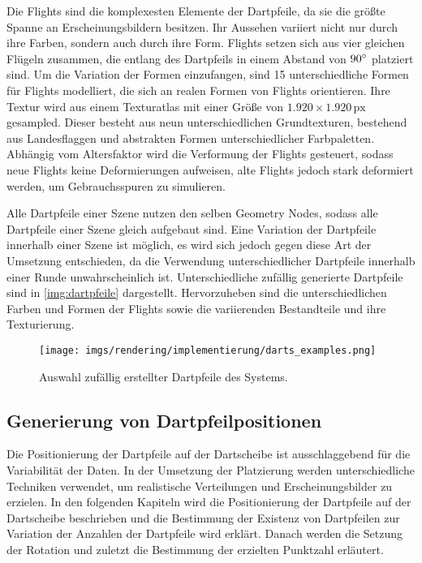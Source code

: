 Die Flights sind die komplexesten Elemente der Dartpfeile, da sie die größte Spanne an Erscheinungsbildern besitzen. Ihr Aussehen variiert nicht nur durch ihre Farben, sondern auch durch ihre Form. Flights setzen sich aus vier gleichen Flügeln zusammen, die entlang des Dartpfeils in einem Abstand von $90^{\circ}$ platziert sind. Um die Variation der Formen einzufangen, sind 15 unterschiedliche Formen für Flights modelliert, die sich an realen Formen von Flights orientieren. Ihre Textur wird aus einem Texturatlas mit einer Größe von $1.920 \times 1.920\,\text{px}$ gesampled. Dieser besteht aus neun unterschiedlichen Grundtexturen, bestehend aus Landesflaggen und abstrakten Formen unterschiedlicher Farbpaletten. Abhängig vom Altersfaktor wird die Verformung der Flights gesteuert, sodass neue Flights keine Deformierungen aufweisen, alte Flights jedoch stark deformiert werden, um Gebrauchsspuren zu simulieren.

\vspace{\baselineskip}

\noindent Alle Dartpfeile einer Szene nutzen den selben Geometry Nodes, sodass alle Dartpfeile einer Szene gleich aufgebaut sind. Eine Variation der Dartpfeile innerhalb einer Szene ist möglich, es wird sich jedoch gegen diese Art der Umsetzung entschieden, da die Verwendung unterschiedlicher Dartpfeile innerhalb einer Runde unwahrscheinlich ist. Unterschiedliche zufällig generierte Dartpfeile sind in \autoref{img:dartpfeile} dargestellt. Hervorzuheben sind die unterschiedlichen Farben und Formen der Flights sowie die variierenden Bestandteile und ihre Texturierung.

\begin{figure}
    \centering
    \texttt{[image: imgs/rendering/implementierung/darts\_examples.png]}
    \caption{Auswahl zufällig erstellter Dartpfeile des Systems.}
    \label{img:dartpfeile}
\end{figure}

\subsection{Generierung von Dartpfeilpositionen}  %
\label{sec:wie_dartpfeil_positionen}

Die Positionierung der Dartpfeile auf der Dartscheibe ist ausschlaggebend für die Variabilität der Daten. In der Umsetzung der Platzierung werden unterschiedliche Techniken verwendet, um realistische Verteilungen und Erscheinungsbilder zu erzielen. In den folgenden Kapiteln wird die Positionierung der Dartpfeile auf der Dartscheibe beschrieben und die Bestimmung der Existenz von Dartpfeilen zur Variation der Anzahlen der Dartpfeile wird erklärt. Danach werden die Setzung der Rotation und zuletzt die Bestimmung der erzielten Punktzahl erläutert.

